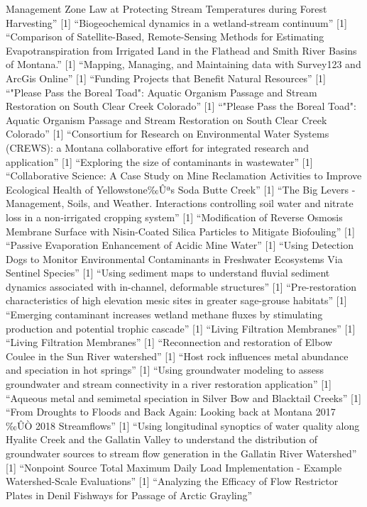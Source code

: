 \documentclass[]{article}
\begin{document}
Management Zone Law at Protecting Stream Temperatures during Forest
Harvesting'' {[}1{]} ``Biogeochemical dynamics in a wetland-stream
continuum'' {[}1{]} ``Comparison of Satellite-Based, Remote-Sensing
Methods for Estimating Evapotranspiration from Irrigated Land in the
Flathead and Smith River Basins of Montana.'' {[}1{]} ``Mapping,
Managing, and Maintaining data with Survey123 and ArcGis Online''
{[}1{]} ``Funding Projects that Benefit Natural Resources'' {[}1{]}
``"Please Pass the Boreal Toad": Aquatic Organism Passage and Stream
Restoration on South Clear Creek Colorado'' {[}1{]} ``"Please Pass the
Boreal Toad": Aquatic Organism Passage and Stream Restoration on South
Clear Creek Colorado'' {[}1{]} ``Consortium for Research on
Environmental Water Systems (CREWS): a Montana collaborative effort for
integrated research and application'' {[}1{]} ``Exploring the size of
contaminants in wastewater'' {[}1{]} ``Collaborative Science: A Case
Study on Mine Reclamation Activities to Improve Ecological Health of
Yellowstone‰Ûªs Soda Butte Creek'' {[}1{]} ``The Big Levers -
Management, Soils, and Weather. Interactions controlling soil water and
nitrate loss in a non-irrigated cropping system'' {[}1{]} ``Modification
of Reverse Osmosis Membrane Surface with Nisin-Coated Silica Particles
to Mitigate Biofouling'' {[}1{]} ``Passive Evaporation Enhancement of
Acidic Mine Water'' {[}1{]} ``Using Detection Dogs to Monitor
Environmental Contaminants in Freshwater Ecosystems Via Sentinel
Species'' {[}1{]} ``Using sediment maps to understand fluvial sediment
dynamics associated with in-channel, deformable structures'' {[}1{]}
``Pre-restoration characteristics of high elevation mesic sites in
greater sage-grouse habitats'' {[}1{]} ``Emerging contaminant increases
wetland methane fluxes by stimulating production and potential trophic
cascade'' {[}1{]} ``Living Filtration Membranes'' {[}1{]} ``Living
Filtration Membranes'' {[}1{]} ``Reconnection and restoration of Elbow
Coulee in the Sun River watershed'' {[}1{]} ``Host rock influences metal
abundance and speciation in hot springs'' {[}1{]} ``Using groundwater
modeling to assess groundwater and stream connectivity in a river
restoration application'' {[}1{]} ``Aqueous metal and semimetal
speciation in Silver Bow and Blacktail Creeks'' {[}1{]} ``From Droughts
to Floods and Back Again: Looking back at Montana 2017 ‰ÛÒ 2018
Streamflows'' {[}1{]} ``Using longitudinal synoptics of water quality
along Hyalite Creek and the Gallatin Valley to understand the
distribution of groundwater sources to stream flow generation in the
Gallatin River Watershed'' {[}1{]} ``Nonpoint Source Total Maximum Daily
Load Implementation - Example Watershed-Scale Evaluations'' {[}1{]}
``Analyzing the Efficacy of Flow Restrictor Plates in Denil Fishways for
Passage of Arctic Grayling''
\end{document}
